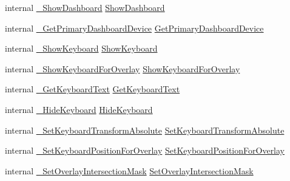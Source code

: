 \begin{DoxyCompactItemize}
\item 
internal \mbox{\hyperlink{struct_valve_1_1_v_r_1_1_i_v_r_overlay_ab4a713cf43946bbc014316ba20c21a3e}{\+\_\+\+Show\+Dashboard}} \mbox{\hyperlink{struct_valve_1_1_v_r_1_1_i_v_r_overlay_a448d09ab757b70b664a7447339e8a641}{Show\+Dashboard}}
\item 
internal \mbox{\hyperlink{struct_valve_1_1_v_r_1_1_i_v_r_overlay_ad8a44528c5a3aefe931435586391a25c}{\+\_\+\+Get\+Primary\+Dashboard\+Device}} \mbox{\hyperlink{struct_valve_1_1_v_r_1_1_i_v_r_overlay_abe98e949dc6349843d42ccc22078be49}{Get\+Primary\+Dashboard\+Device}}
\item 
internal \mbox{\hyperlink{struct_valve_1_1_v_r_1_1_i_v_r_overlay_a3f0da6da79c2932b9619f74f119f24f5}{\+\_\+\+Show\+Keyboard}} \mbox{\hyperlink{struct_valve_1_1_v_r_1_1_i_v_r_overlay_a3433ac58417758118728876bed2eda67}{Show\+Keyboard}}
\item 
internal \mbox{\hyperlink{struct_valve_1_1_v_r_1_1_i_v_r_overlay_ad13a58d49b69b35ac76962579290372f}{\+\_\+\+Show\+Keyboard\+For\+Overlay}} \mbox{\hyperlink{struct_valve_1_1_v_r_1_1_i_v_r_overlay_a1af4052892eb3240f5c314271a2886d1}{Show\+Keyboard\+For\+Overlay}}
\item 
internal \mbox{\hyperlink{struct_valve_1_1_v_r_1_1_i_v_r_overlay_a6c94397fef04c6bac6f7865bb92ed82a}{\+\_\+\+Get\+Keyboard\+Text}} \mbox{\hyperlink{struct_valve_1_1_v_r_1_1_i_v_r_overlay_af8228d50bda98e95b857a70045ad1d36}{Get\+Keyboard\+Text}}
\item 
internal \mbox{\hyperlink{struct_valve_1_1_v_r_1_1_i_v_r_overlay_acd7a1c9668b31dc428bd90a91d841841}{\+\_\+\+Hide\+Keyboard}} \mbox{\hyperlink{struct_valve_1_1_v_r_1_1_i_v_r_overlay_a1e4a5e386003ceb8792837deefc1cfee}{Hide\+Keyboard}}
\item 
internal \mbox{\hyperlink{struct_valve_1_1_v_r_1_1_i_v_r_overlay_a972e7074df2f3719f9df1233d0d4bab9}{\+\_\+\+Set\+Keyboard\+Transform\+Absolute}} \mbox{\hyperlink{struct_valve_1_1_v_r_1_1_i_v_r_overlay_a6301a1becb7f7585b70cc413d903b9c1}{Set\+Keyboard\+Transform\+Absolute}}
\item 
internal \mbox{\hyperlink{struct_valve_1_1_v_r_1_1_i_v_r_overlay_a2caf87222d0045e8ad341e4ede54a985}{\+\_\+\+Set\+Keyboard\+Position\+For\+Overlay}} \mbox{\hyperlink{struct_valve_1_1_v_r_1_1_i_v_r_overlay_a6df0e4e19dbfc4e1aae3870d7cd3e8f8}{Set\+Keyboard\+Position\+For\+Overlay}}
\item 
internal \mbox{\hyperlink{struct_valve_1_1_v_r_1_1_i_v_r_overlay_a4c59154888075e11f6eb2515fa9f3678}{\+\_\+\+Set\+Overlay\+Intersection\+Mask}} \mbox{\hyperlink{struct_valve_1_1_v_r_1_1_i_v_r_overlay_a244fb8807dfa0423820e38899e041395}{Set\+Overlay\+Intersection\+Mask}}

\end{DoxyCompactItemize}
